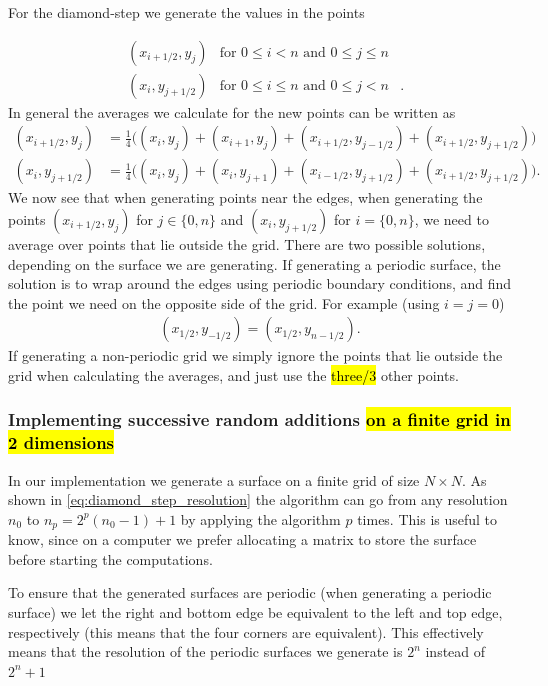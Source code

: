 For the diamond-step we generate the values in the points

\begin{align*}
    &(x_{i+1/2}, y_j) &\text{for } 0\leq i<n \text{ and } 0\leq j \leq n& \\
    &(x_i, y_{j+1/2}) &\text{for } 0\leq i\leq n \text{ and } 0\leq j < n&.
\end{align*}
In general the averages we calculate for the new points can be written as
\begin{align*}
    (x_{i+1/2}, y_j) 
    &= 
    \frac{1}{4}\big(
        (x_i, y_j) + (x_{i+1}, y_j) + (x_{i+1/2}, y_{j-1/2}) + (x_{i+1/2}, y_{j+1/2})
    \big)\\
    (x_i, y_{j+1/2}) 
    &= 
    \frac{1}{4}\big(
        (x_i, y_j) + (x_i, y_{j+1}) + (x_{i-1/2}, y_{j+1/2}) + (x_{i+1/2}, y_{j+1/2})
    \big).
\end{align*}
We now see that when generating points near the edges, when generating the points $(x_{i+1/2}, y_j)$ for $j \in \{0, n\}$ and $(x_i, y_{j+1/2})$ for $i = \{0, n\}$, we need to average over points that lie outside the grid. There are two possible solutions, depending on the surface we are generating. If generating a periodic surface, the solution is to wrap around the edges using periodic boundary conditions, and find the point we need on the opposite side of the grid. For example (using $i = j = 0$)
\begin{align*}
    (x_{1/2}, y_{-1/2}) = (x_{1/2}, y_{n-1/2}).
\end{align*}
If generating a non-periodic grid we simply ignore the points that lie outside the grid when calculating the averages, and just use the \hl{three/3} other points.

\subsubsection{Implementing successive random additions \hl{on a finite grid in 2 dimensions}}
In our implementation we generate a surface on a finite grid of size $N\times N$. As shown in \cref{eq:diamond_step_resolution} the algorithm can go from any resolution $n_0$ to $n_p = 2^p(n_0-1) + 1$ by applying the algorithm $p$ times. This is useful to know, since on a computer we prefer allocating a matrix to store the surface before starting the computations.

To ensure that the generated surfaces are periodic (when generating a periodic surface) we let the right and bottom edge be equivalent to the left and top edge, respectively (this means that the four corners are equivalent). This effectively means that the resolution of the periodic surfaces we generate is $2^n$ instead of $2^n+1$


